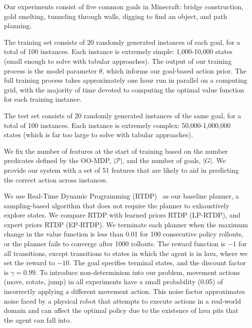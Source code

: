 \documentclass[11pt]{article}
\begin{document}
Our experiments consist of five common goals in Minecraft:
bridge construction, gold smelting, tunneling through
walls, digging to find an object, and path planning.

The training set consists of 20 randomly generated instances of each goal, for a total of 100 instances. Each instance is extremely simple: 1,000-10,000 states (small enough to solve with tabular approaches). The output of our training process is the model parameter $\theta$, which informs our goal-based action prior. The full training process takes approximately one hour run in parallel on a computing grid, with the majority of time devoted to computing the optimal value function for each training instance.

The test set consists of 20 randomly generated instances of the same goal, for a total of 100 instances. Each instance is extremely complex: 50,000-1,000,000 states (which is far too large to solve with tabular approaches).


We fix the number of features at the start of training based on the number
predicates defined by the OO-MDP, $|\mathcal{P}|$, and the number of goals, $|G|$.
We provide our system with a set of 51 features that are likely to aid in predicting the correct action across instances.

We use Real-Time Dynamic Programming (RTDP)~\cite{barto95} as our
baseline planner, a sampling-based algorithm that does not require the
planner to exhaustively explore states. We compare RTDP with learned
priors RTDP (LP-RTDP), and expert priors RTDP (EP-RTDP).
We terminate each planner when the maximum change in
the value function is less than 0.01 for 100 consecutive policy
rollouts, or the planner fails to converge after 1000 rollouts.  The
reward function is $-1$ for all transitions, except transitions to
states in which the agent is in lava, where we set the reward to
$-10$. The goal specifies terminal states, and the discount factor is
$\gamma = 0.99$.  To introduce non-determinism into our problem,
movement actions (move, rotate, jump) in all experiments have a small
probability (0.05) of incorrectly applying a different movement
action.  This noise factor approximates noise faced by a physical
robot that attempts to execute actions in a real-world domain and
can affect the optimal policy due to the existence of lava pits
that the agent can fall into. 
\end{document}
